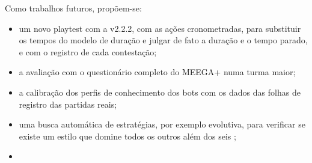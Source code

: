 Como trabalhos futuros, propõem-se:
\begin{itemize}
  \item um novo playtest com a v2.2.2, com as ações cronometradas, para substituir os tempos do modelo de duração
    e julgar de fato a duração e o tempo parado, e com o registro de cada contestação;
  \item a avaliação com o questionário completo do MEEGA+ \cite{petri2017meega} numa turma maior;
  \item a calibração dos perfis de conhecimento dos bots com os dados das folhas de registro das partidas reais;
  \item uma busca automática de estratégias, por exemplo evolutiva, para verificar se existe um estilo que
    domine todos os outros além dos seis ;
  \item {}
\end{itemize}

